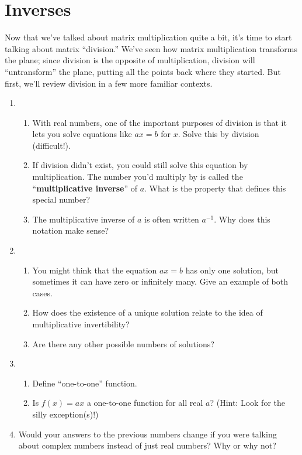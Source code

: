 \documentclass[../gatm.tex]{subfiles}
\begin{document}
\section{Inverses}
\setcounter{problem_i}{0}

\noindent Now that we've talked about matrix multiplication quite a bit, it's time to start talking about matrix ``division.'' We've seen how matrix multiplication transforms the plane; since division is the opposite of multiplication, division will ``untransform'' the plane, putting all the points back where they started. But first, we'll review division in a few more familiar contexts.

\begin{enumerate}
\setcounter{enumi}{\value{problem_i}}
\item \begin{enumerate}
\item With real numbers, one of the important purposes of division is that it lets you solve equations like $ax=b$ for $x$. Solve this by division (difficult!).
\item If division didn't exist, you could still solve this equation by multiplication. The number you'd multiply by is called the ``\textbf{multiplicative inverse}'' of $a$. What is the property that defines this special number?
\item The multiplicative inverse of $a$ is often written $a^{-1}$. Why does this notation make sense?
\end{enumerate}
\item \begin{enumerate}
\item You might think that the equation $ax=b$ has only one solution, but sometimes it can have zero or infinitely many. Give an example of both cases.
\item How does the existence of a unique solution relate to the idea of multiplicative invertibility?
\item Are there any other possible numbers of solutions?
\end{enumerate}
\item \begin{enumerate}
\item Define ``one-to-one'' function.
\item Is $f(x)=ax$ a one-to-one function for all real $a$? (Hint: Look for the silly exception(s)!)
\end{enumerate}
\item Would your answers to the previous numbers change if you were talking about complex numbers instead of just real numbers? Why or why not?
\setcounter{problem_i}{\value{enumi}}
\end{enumerate}
\end{document}

